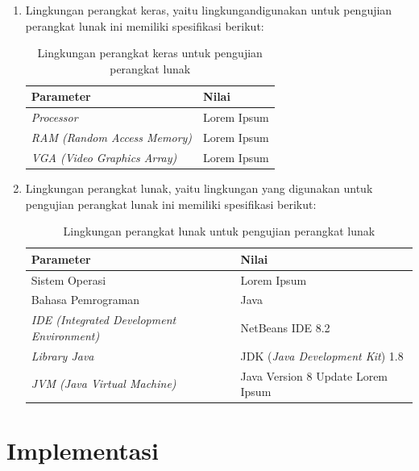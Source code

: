 \begin{enumerate}
\item Lingkungan perangkat keras, yaitu lingkungandigunakan untuk pengujian perangkat lunak ini memiliki spesifikasi berikut:

\begin{table}
\centering
\captionsetup{justification=centering}
\caption[Lingkungan perangkat keras untuk pengujian perangkat lunak]{Lingkungan perangkat keras untuk pengujian perangkat lunak}
\begin{tabular}{| l | l |}
\hline
Parameter & Nilai \\
\hline \hline
\textit{Processor} & Lorem Ipsum \\
\hline
\textit{RAM (Random Access Memory)} & Lorem Ipsum \\
\hline
\textit{VGA (Video Graphics Array)} & Lorem Ipsum \\
\hline
\end{tabular}
\label{tab:lingkunganpk}
\end{table}

\item Lingkungan perangkat lunak, yaitu lingkungan yang digunakan untuk pengujian perangkat lunak ini memiliki spesifikasi berikut:

\begin{table}
\centering
\captionsetup{justification=centering}
\caption[Lingkungan perangkat lunak untuk pengujian perangkat lunak]{Lingkungan perangkat lunak untuk pengujian perangkat lunak}
\begin{tabular}{| l | l |}
\hline
Parameter & Nilai \\
\hline \hline
Sistem Operasi & Lorem Ipsum \\
\hline
Bahasa Pemrograman & Java \\
\hline
\textit{IDE (Integrated Development Environment)} & NetBeans IDE 8.2 \\
\hline
\textit{Library Java} & JDK (\textit{Java Development Kit}) 1.8 \\
\hline
\textit{JVM (Java Virtual Machine)} & Java Version 8 Update Lorem Ipsum \\
\hline
\end{tabular}
\label{tab:lingkunganpl}
\end{table}

\end{enumerate}

\section{Implementasi}
\label{sec:implementasi}

